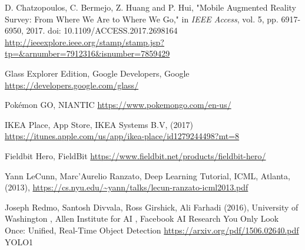 \begin{thebibliography}{X}
D. Chatzopoulos, C. Bermejo, Z. Huang and P. Hui, "Mobile Augmented Reality Survey: From Where We Are to Where We Go," in \textit{IEEE Access}, vol. 5, pp. 6917-6950, 2017.
doi: 10.1109/ACCESS.2017.2698164
\url{http://ieeexplore.ieee.org/stamp/stamp.jsp?tp=&arnumber=7912316&isnumber=7859429}

Glass Explorer Edition, Google Developers, Google
\url{https://developers.google.com/glass/}

Pokémon GO, NIANTIC
\url{https://www.pokemongo.com/en-us/}


IKEA Place, App Store, IKEA Systems B.V, (2017)
\url{https://itunes.apple.com/us/app/ikea-place/id1279244498?mt=8}

Fieldbit Hero, FieldBit
\url{https://www.fieldbit.net/products/fieldbit-hero/}

Yann LeCunn, Marc'Aurelio Ranzato, Deep Learning Tutorial, ICML, Atlanta, (2013), 
\url{https://cs.nyu.edu/~yann/talks/lecun-ranzato-icml2013.pdf}

Joseph Redmo, Santosh Divvala, Ross Girshick, Ali Farhadi (2016), University of Washington
, Allen Institute for AI
, Facebook AI Research
You Only Look Once: Unified, Real-Time Object Detection
\url{https://arxiv.org/pdf/1506.02640.pdf} YOLO1


\end{thebibliography}
